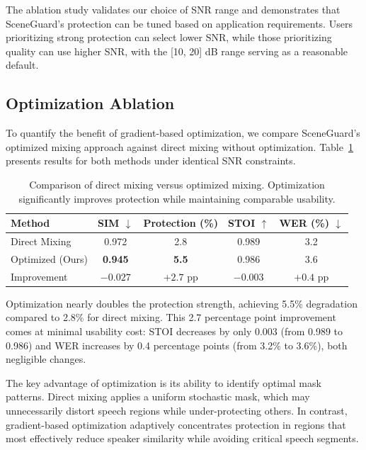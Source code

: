 The ablation study validates our choice of SNR range and demonstrates that SceneGuard's protection can be tuned based on application requirements. Users prioritizing strong protection can select lower SNR, while those prioritizing quality can use higher SNR, with the [10, 20] dB range serving as a reasonable default.

\subsection{Optimization Ablation}

To quantify the benefit of gradient-based optimization, we compare SceneGuard's optimized mixing approach against direct mixing without optimization. Table~\ref{tab:optimization_ablation} presents results for both methods under identical SNR constraints.

\begin{table}[t]
\centering
\caption{Comparison of direct mixing versus optimized mixing. Optimization significantly improves protection while maintaining comparable usability.}
\label{tab:optimization_ablation}
\small
\begin{tabular}{lcccc}
\toprule
Method & SIM $\downarrow$ & Protection (\%) & STOI $\uparrow$ & WER (\%) $\downarrow$ \\
\midrule
Direct Mixing & 0.972 & 2.8 & 0.989 & 3.2 \\
Optimized (Ours) & \textbf{0.945} & \textbf{5.5} & 0.986 & 3.6 \\
\midrule
Improvement & $-0.027$ & $+2.7$ pp & $-0.003$ & $+0.4$ pp \\
\bottomrule
\end{tabular}
\end{table}

Optimization nearly doubles the protection strength, achieving 5.5\% degradation compared to 2.8\% for direct mixing. This 2.7 percentage point improvement comes at minimal usability cost: STOI decreases by only 0.003 (from 0.989 to 0.986) and WER increases by 0.4 percentage points (from 3.2\% to 3.6\%), both negligible changes.

The key advantage of optimization is its ability to identify optimal mask patterns. Direct mixing applies a uniform stochastic mask, which may unnecessarily distort speech regions while under-protecting others. In contrast, gradient-based optimization adaptively concentrates protection in regions that most effectively reduce speaker similarity while avoiding critical speech segments.


